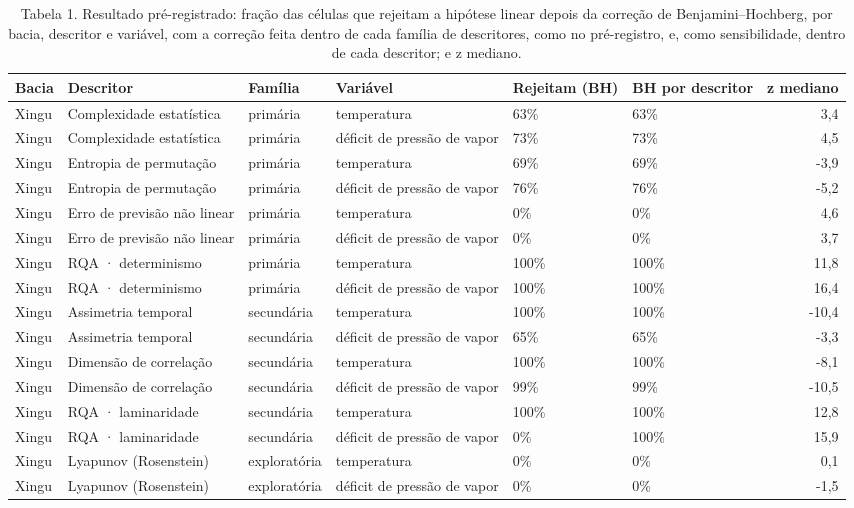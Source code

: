 \begin{table}
\caption{Tabela 1. Resultado pré-registrado: fração das células que rejeitam a hipótese linear depois da correção de Benjamini–Hochberg, por bacia, descritor e variável, com a correção feita dentro de cada família de descritores, como no pré-registro, e, como sensibilidade, dentro de cada descritor; e z mediano.}
\label{tab:07_descritores::rejeicao_bh}
\begin{tabular}{llllllr}
\toprule
Bacia & Descritor & Família & Variável & Rejeitam (BH) & BH por descritor & z mediano \\
\midrule
Xingu & Complexidade estatística & primária & temperatura & 63\% & 63\% & 3,4 \\
Xingu & Complexidade estatística & primária & déficit de pressão de vapor & 73\% & 73\% & 4,5 \\
Xingu & Entropia de permutação & primária & temperatura & 69\% & 69\% & -3,9 \\
Xingu & Entropia de permutação & primária & déficit de pressão de vapor & 76\% & 76\% & -5,2 \\
Xingu & Erro de previsão não linear & primária & temperatura & 0\% & 0\% & 4,6 \\
Xingu & Erro de previsão não linear & primária & déficit de pressão de vapor & 0\% & 0\% & 3,7 \\
Xingu & RQA · determinismo & primária & temperatura & 100\% & 100\% & 11,8 \\
Xingu & RQA · determinismo & primária & déficit de pressão de vapor & 100\% & 100\% & 16,4 \\
Xingu & Assimetria temporal & secundária & temperatura & 100\% & 100\% & -10,4 \\
Xingu & Assimetria temporal & secundária & déficit de pressão de vapor & 65\% & 65\% & -3,3 \\
Xingu & Dimensão de correlação & secundária & temperatura & 100\% & 100\% & -8,1 \\
Xingu & Dimensão de correlação & secundária & déficit de pressão de vapor & 99\% & 99\% & -10,5 \\
Xingu & RQA · laminaridade & secundária & temperatura & 100\% & 100\% & 12,8 \\
Xingu & RQA · laminaridade & secundária & déficit de pressão de vapor & 0\% & 100\% & 15,9 \\
Xingu & Lyapunov (Rosenstein) & exploratória & temperatura & 0\% & 0\% & 0,1 \\
Xingu & Lyapunov (Rosenstein) & exploratória & déficit de pressão de vapor & 0\% & 0\% & -1,5 \\

\end{tabular}
\end{table}
